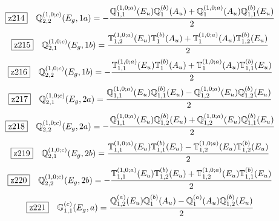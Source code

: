 \documentclass[fleqn,10pt,landscape]{jsarticle}
\begin{document}
\begin{dmath*}
\hspace*{3mm}\fbox{z214}\quad \mathbb{Q}_{2,2}^{(1,0;c)}(E_{g},1a)=- \frac{\mathbb{Q}_{1,1}^{(1,0;a)}(E_{u}) \mathbb{Q}_{1}^{(b)}(A_{u}) + \mathbb{Q}_{1}^{(1,0;a)}(A_{u}) \mathbb{Q}_{1,1}^{(b)}(E_{u})}{2}
\end{dmath*}
\begin{dmath*}
\hspace*{3mm}\fbox{z215}\quad \mathbb{Q}_{2,1}^{(1,0;c)}(E_{g},1b)=\frac{\mathbb{T}_{1,2}^{(1,0;a)}(E_{u}) \mathbb{T}_{1}^{(b)}(A_{u}) + \mathbb{T}_{1}^{(1,0;a)}(A_{u}) \mathbb{T}_{1,2}^{(b)}(E_{u})}{2}
\end{dmath*}
\begin{dmath*}
\hspace*{3mm}\fbox{z216}\quad \mathbb{Q}_{2,2}^{(1,0;c)}(E_{g},1b)=- \frac{\mathbb{T}_{1,1}^{(1,0;a)}(E_{u}) \mathbb{T}_{1}^{(b)}(A_{u}) + \mathbb{T}_{1}^{(1,0;a)}(A_{u}) \mathbb{T}_{1,1}^{(b)}(E_{u})}{2}
\end{dmath*}
\begin{dmath*}
\hspace*{3mm}\fbox{z217}\quad \mathbb{Q}_{2,1}^{(1,0;c)}(E_{g},2a)=\frac{\mathbb{Q}_{1,1}^{(1,0;a)}(E_{u}) \mathbb{Q}_{1,1}^{(b)}(E_{u}) - \mathbb{Q}_{1,2}^{(1,0;a)}(E_{u}) \mathbb{Q}_{1,2}^{(b)}(E_{u})}{2}
\end{dmath*}
\begin{dmath*}
\hspace*{3mm}\fbox{z218}\quad \mathbb{Q}_{2,2}^{(1,0;c)}(E_{g},2a)=- \frac{\mathbb{Q}_{1,1}^{(1,0;a)}(E_{u}) \mathbb{Q}_{1,2}^{(b)}(E_{u}) + \mathbb{Q}_{1,2}^{(1,0;a)}(E_{u}) \mathbb{Q}_{1,1}^{(b)}(E_{u})}{2}
\end{dmath*}
\begin{dmath*}
\hspace*{3mm}\fbox{z219}\quad \mathbb{Q}_{2,1}^{(1,0;c)}(E_{g},2b)=\frac{\mathbb{T}_{1,1}^{(1,0;a)}(E_{u}) \mathbb{T}_{1,1}^{(b)}(E_{u}) - \mathbb{T}_{1,2}^{(1,0;a)}(E_{u}) \mathbb{T}_{1,2}^{(b)}(E_{u})}{2}
\end{dmath*}
\begin{dmath*}
\hspace*{3mm}\fbox{z220}\quad \mathbb{Q}_{2,2}^{(1,0;c)}(E_{g},2b)=- \frac{\mathbb{T}_{1,1}^{(1,0;a)}(E_{u}) \mathbb{T}_{1,2}^{(b)}(E_{u}) + \mathbb{T}_{1,2}^{(1,0;a)}(E_{u}) \mathbb{T}_{1,1}^{(b)}(E_{u})}{2}
\end{dmath*}
\begin{dmath*}
\hspace*{3mm}\fbox{z221}\quad \mathbb{G}_{1,1}^{(c)}(E_{g},a)=\frac{\mathbb{Q}_{1,2}^{(a)}(E_{u}) \mathbb{Q}_{1}^{(b)}(A_{u}) - \mathbb{Q}_{1}^{(a)}(A_{u}) \mathbb{Q}_{1,2}^{(b)}(E_{u})}{2}
\end{dmath*}
\end{document}

